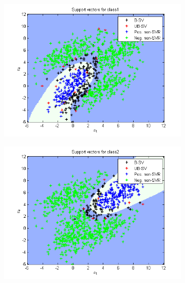 \documentclass{article}
\begin{document}
\begin{figure}
\begin{subfigure}{.5\textwidth}
  \centering
  \includegraphics[width=.8\linewidth]{Classification/1c/c_g/sv1}
 
\end{subfigure}%
\begin{subfigure}{.5\textwidth}
  \centering
  \includegraphics[width=.8\linewidth]{Classification/1c/c_g/sv2}
  
\end{subfigure}
\end{figure}
\end{document}

